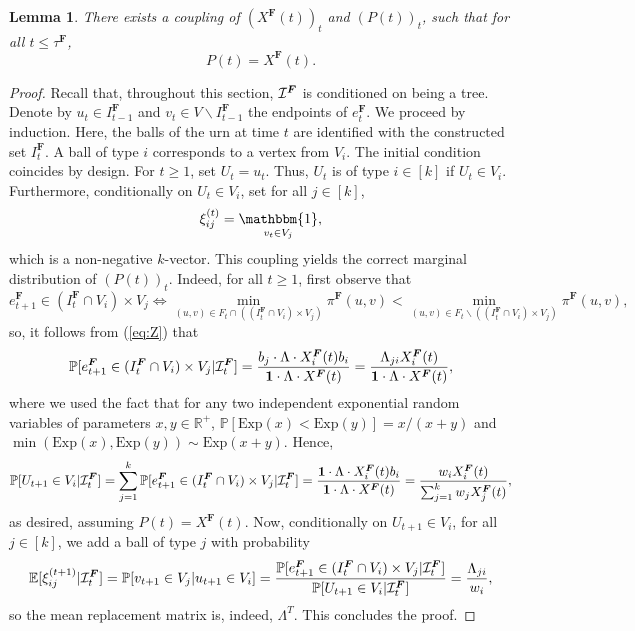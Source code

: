 \documentclass[11pt]{article}
\numberwithin{equation}{section}
\DeclareMathOperator{\indicatrice}{\mathbbm{1}}
\newtheorem{lemma}[theorem]{Lemma}
\theoremstyle{definition}
\newcommand\bE{{\mathbb E}}
\newcommand\bP{{\mathbb P}}
\newcommand\bR{{\mathbb R}}
\newcommand\cI{{\cal{I}}}
\begin{document}
\begin{lemma}
\label{PU}
There exists a coupling of $(X^{\boldsymbol{F}}(t))_t$ and $(P(t))_t$, such that for all $t\leq \tau^{\boldsymbol{F}}$,
$$P(t)= X^{\boldsymbol{F}}(t).$$
\end{lemma}

\begin{proof}
Recall that, throughout this section, $\cI^{\boldsymbol{F}}$ is conditioned on being a tree. Denote by $u_t \in I^{\boldsymbol{F}}_{t-1}$ and $v_t \in V\backslash I^{\boldsymbol{F}}_{t-1}$ the endpoints of $e^{\boldsymbol{F}}_t$. We proceed by induction. Here, the balls of the urn at time $t$ are identified with the constructed set $I^{\boldsymbol{F}}_t$. A ball of type $i$ corresponds to a vertex from $V_i$. The initial condition coincides by design. For $t \geq 1$, set $U_t= u_t$. Thus, $U_t$ is of type $i \in [k]$ if $U_t \in V_i$. Furthermore, conditionally on $U_t\in V_i$, set for all $j \in [k]$,
$$\xi^{(t)}_{ij} = \indicatrice_{v_t \in V_j}, $$
which is a non-negative $k$-vector. This coupling yields the correct marginal distribution of $(P(t))_t$. Indeed, for all $t\geq 1$, first observe that 
$$e^{\boldsymbol{F}}_{t+1} \in (I^{\boldsymbol{F}}_{t}\cap V_i)\times V_j \Longleftrightarrow \min_{(u,v)\in F_t\cap \left((I^{\boldsymbol{F}}_{t}\cap V_i)\times V_j\right)} \pi^{\boldsymbol{F}}(u,v) < \min_{(u,v)\in F_t \backslash \left((I^{\boldsymbol{F}}_{t}\cap V_i)\times V_j\right)} \pi^{\boldsymbol{F}}(u,v),  $$
so, it follows from (\ref{eq:Z}) that
$$\bP[e^{\boldsymbol{F}}_{t+1} \in (I^{\boldsymbol{F}}_{t}\cap V_i)\times V_j|{\cI}^{\boldsymbol{F}}_{t}] = \frac{b_j\cdot \Lambda \cdot X^{\boldsymbol{F}}_i(t)b_i }{\boldsymbol{1}\cdot \Lambda \cdot X^{\boldsymbol{F}}(t)} = \frac{\Lambda_{ji}X^{\boldsymbol{F}}_i(t)}{\boldsymbol{1}\cdot \Lambda \cdot X^{\boldsymbol{F}}(t)},  $$
where we used the fact that for any two independent exponential random variables of parameters $x,y \in \bR^+$, $\bP[\textrm{Exp}(x)<\textrm{Exp}(y)] = x/(x+y)$ and $\min(\textrm{Exp}(x),\textrm{Exp}(y)) \sim \textrm{Exp}(x+y)$. Hence,
\begin{equation*}
    \bP[U_{t+1}\in V_i|{\cI}^{\boldsymbol{F}}_t] = \sum_{j=1}^k \bP[e^{\boldsymbol{F}}_{t+1} \in (I^{\boldsymbol{F}}_{t}\cap V_i)\times V_j|{\cI}^{\boldsymbol{F}}_{t}] = \frac{\boldsymbol{1}\cdot \Lambda \cdot X^{\boldsymbol{F}}_i(t)b_i }{\boldsymbol{1}\cdot \Lambda \cdot X^{\boldsymbol{F}}(t)} = \frac{w_iX^{\boldsymbol{F}}_i(t)}{\sum_{j=1}^k w_j X^{\boldsymbol{F}}_j(t)},
\end{equation*}
as desired, assuming $P(t)=X^{\boldsymbol{F}}(t)$. Now, conditionally on $U_{t+1} \in V_i$, for all $j\in [k]$, we add a ball of type $j$ with probability
$$\bE[\xi^{(t+1)}_{ij}|{\cI}^{\boldsymbol{F}}_{t}] = \bP[v_{t+1} \in V_j | u_{t+1} \in  V_i] = \frac{\bP[e^{\boldsymbol{F}}_{t+1} \in (I^{\boldsymbol{F}}_{t}\cap V_i)\times V_j|{\cI}^{\boldsymbol{F}}_{t}]}{\bP[U_{t+1}\in V_i|{\cI}^{\boldsymbol{F}}_t]}=\frac{\Lambda_{ji}}{w_i}, $$
so the mean replacement matrix is, indeed, $\Lambda^T$. This concludes the proof.
\end{proof}
\end{document}
